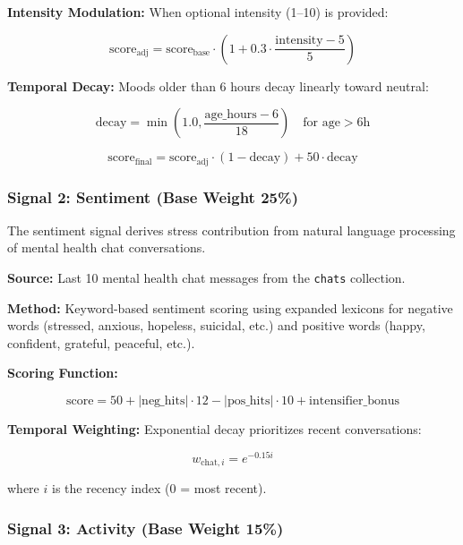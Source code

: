 \documentclass[journal]{IEEEtran}
\begin{document}
\textbf{Intensity Modulation:} When optional intensity (1--10) is provided:

\begin{equation}
\text{score}_{\text{adj}} = \text{score}_{\text{base}} \cdot \left(1 + 0.3 \cdot \frac{\text{intensity} - 5}{5}\right)
\end{equation}

\textbf{Temporal Decay:} Moods older than 6 hours decay linearly toward neutral:

\begin{equation}
\text{decay} = \min\left(1.0, \frac{\text{age\_hours} - 6}{18}\right) \quad \text{for age} > 6\text{h}
\end{equation}

\begin{equation}
\text{score}_{\text{final}} = \text{score}_{\text{adj}} \cdot (1 - \text{decay}) + 50 \cdot \text{decay}
\end{equation}

\subsubsection{Signal 2: Sentiment (Base Weight 25\%)}

The sentiment signal derives stress contribution from natural language processing of mental health chat conversations.

\textbf{Source:} Last 10 mental health chat messages from the \texttt{chats} collection.

\textbf{Method:} Keyword-based sentiment scoring using expanded lexicons for negative words (stressed, anxious, hopeless, suicidal, etc.) and positive words (happy, confident, grateful, peaceful, etc.).

\textbf{Scoring Function:}

\begin{equation}
\text{score} = 50 + |\text{neg\_hits}| \cdot 12 - |\text{pos\_hits}| \cdot 10 + \text{intensifier\_bonus}
\end{equation}

\textbf{Temporal Weighting:} Exponential decay prioritizes recent conversations:

\begin{equation}
w_{\text{chat},i} = e^{-0.15i}
\end{equation}

where $i$ is the recency index (0 = most recent).

\subsubsection{Signal 3: Activity (Base Weight 15\%)}
\end{document}
